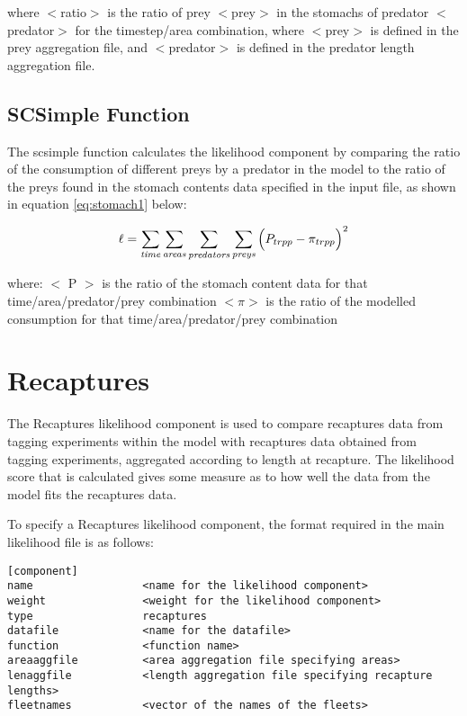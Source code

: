 \documentclass[]{book}
\begin{document}
where \(<\)ratio\(>\) is the ratio of prey \(<\)prey\(>\) in the stomachs of
predator \(<\)predator\(>\) for the timestep/area combination, where
\(<\)prey\(>\) is defined in the prey aggregation file, and \(<\)predator\(>\)
is defined in the predator length aggregation file.

\hypertarget{scsimple-function}{%
\subsection{SCSimple Function}\label{scsimple-function}}

The scsimple function calculates the likelihood component by comparing
the ratio of the consumption of different preys by a predator in the
model to the ratio of the preys found in the stomach contents data
specified in the input file, as shown in
equation \eqref{eq:stomach1} below:

\begin{equation}
\label{eq:stomach1}
\ell = \sum_{\it time}\sum_{\it areas}\sum_{\it predators}\sum_{\it preys} \Big( P_{trpp} - \pi_{trpp} \Big) ^2\end{equation}

where: \(<\) P \(>\) is the ratio of the stomach content data for that
time/area/predator/prey combination \(<\pi>\) is the ratio of the modelled
consumption for that time/area/predator/prey combination

\hypertarget{sec:recaptures}{%
\section{Recaptures}\label{sec:recaptures}}

The Recaptures likelihood component is used to compare recaptures data
from tagging experiments within the model with recaptures data obtained
from tagging experiments, aggregated according to length at recapture.
The likelihood score that is calculated gives some measure as to how
well the data from the model fits the recaptures data.

To specify a Recaptures likelihood component, the format required in the
main likelihood file is as follows:

\begin{verbatim}
[component]
name                 <name for the likelihood component>
weight               <weight for the likelihood component>
type                 recaptures
datafile             <name for the datafile>
function             <function name>
areaaggfile          <area aggregation file specifying areas>
lenaggfile           <length aggregation file specifying recapture lengths>
fleetnames           <vector of the names of the fleets>
\end{verbatim}
\end{document}
